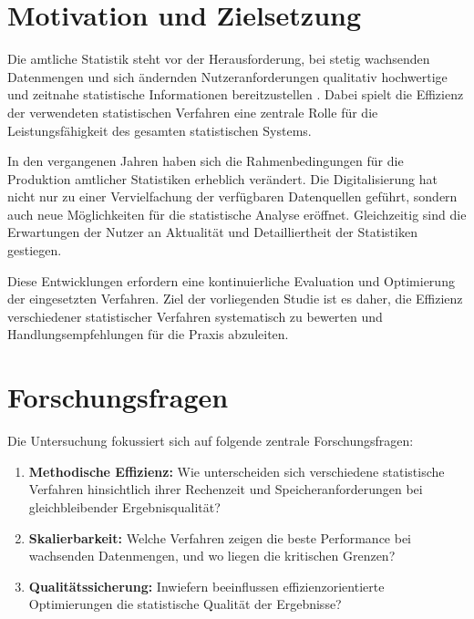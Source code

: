 \documentclass[
  ngerman,
  10pt,
  letterpaper,
]{book}
\begin{document}
\section*{Motivation und Zielsetzung}\label{motivation-und-zielsetzung}


Die amtliche Statistik steht vor der Herausforderung, bei stetig
wachsenden Datenmengen und sich ändernden Nutzeranforderungen qualitativ
hochwertige und zeitnahe statistische Informationen bereitzustellen
\autocite{destatis2023}. Dabei spielt die Effizienz der verwendeten
statistischen Verfahren eine zentrale Rolle für die Leistungsfähigkeit
des gesamten statistischen Systems.

In den vergangenen Jahren haben sich die Rahmenbedingungen für die
Produktion amtlicher Statistiken erheblich verändert. Die
Digitalisierung hat nicht nur zu einer Vervielfachung der verfügbaren
Datenquellen geführt, sondern auch neue Möglichkeiten für die
statistische Analyse eröffnet. Gleichzeitig sind die Erwartungen der
Nutzer an Aktualität und Detailliertheit der Statistiken gestiegen.

Diese Entwicklungen erfordern eine kontinuierliche Evaluation und
Optimierung der eingesetzten Verfahren. Ziel der vorliegenden Studie ist
es daher, die Effizienz verschiedener statistischer Verfahren
systematisch zu bewerten und Handlungsempfehlungen für die Praxis
abzuleiten.

\section*{Forschungsfragen}\label{forschungsfragen}


Die Untersuchung fokussiert sich auf folgende zentrale Forschungsfragen:

\begin{enumerate}
\def\labelenumi{\arabic{enumi}.}
\item
  \textbf{Methodische Effizienz:} Wie unterscheiden sich verschiedene
  statistische Verfahren hinsichtlich ihrer Rechenzeit und
  Speicheranforderungen bei gleichbleibender Ergebnisqualität?
\item
  \textbf{Skalierbarkeit:} Welche Verfahren zeigen die beste Performance
  bei wachsenden Datenmengen, und wo liegen die kritischen Grenzen?
\item
  \textbf{Qualitätssicherung:} Inwiefern beeinflussen
  effizienzorientierte Optimierungen die statistische Qualität der
  Ergebnisse?
\end{enumerate}
\end{document}
